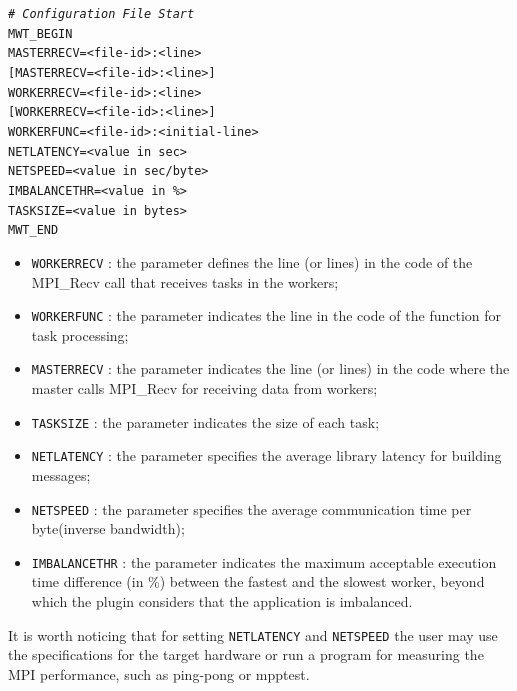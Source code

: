 \documentclass[11pt,a4paper, oneside]{book} %
\newenvironment{code}%
{
\addtolength{\leftskip}{0.5cm}}%
{

}
\begin{document}
\begin{code}
\texttt{\textit{\# Configuration File Start}} \\
\texttt{MWT\_BEGIN} \\
\texttt{MASTERRECV=<file-id>:<line>} \\
\texttt{[MASTERRECV=<file-id>:<line>]} \\
\texttt{WORKERRECV=<file-id>:<line>} \\
\texttt{[WORKERRECV=<file-id>:<line>]} \\
\texttt{WORKERFUNC=<file-id>:<initial-line>} \\
\texttt{NETLATENCY=<value in sec>} \\
\texttt{NETSPEED=<value in sec/byte>} \\
\texttt{IMBALANCETHR=<value in \%>} \\
\texttt{TASKSIZE=<value in bytes>} \\
\texttt{MWT\_END} \\
\end{code}


\begin{itemize}
\item{\tt WORKERRECV} : the parameter defines the line (or lines) in the code
of the MPI\_Recv call that receives tasks in the workers;
\item{\tt WORKERFUNC} : the parameter indicates the line in the code of the function for task processing;
\item{\tt MASTERRECV} : the parameter indicates the line (or lines) in the code where the master calls MPI\_Recv for receiving data from workers;
\item{\tt TASKSIZE} : the parameter indicates the size of each task;
\item{\tt NETLATENCY} : the parameter specifies the average library latency for building messages;
\item{\tt NETSPEED} : the parameter specifies the average communication time per byte(inverse bandwidth);
\item{\tt IMBALANCETHR} : the parameter indicates the maximum acceptable execution time difference (in \%) between the fastest and the slowest worker, beyond which the plugin considers that the application is imbalanced.

\end{itemize}

It is worth noticing that for setting {\tt NETLATENCY} and {\tt NETSPEED} the user may use the specifications for the target hardware or run a program for measuring the MPI performance, such as ping-pong or mpptest.
\end{document}

